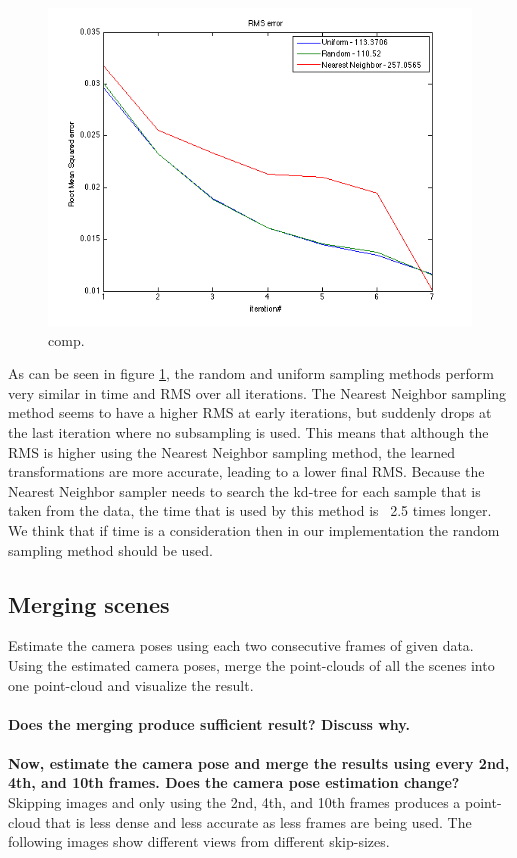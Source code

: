 \documentclass[12pt]{amsart}
\begin{document}
\begin{figure}[H]
\center
\includegraphics[scale=0.5]{images/comparison.png}
\caption{comp.}
\label{comp}
\end{figure}

As can be seen in figure \ref{comp}, the random and uniform sampling methods perform very similar in time and RMS over all iterations. The Nearest Neighbor sampling method seems to have a higher RMS at early iterations, but suddenly drops at the last iteration where no subsampling is used. This means that although the RMS is higher using the Nearest Neighbor sampling method, the learned transformations are more accurate, leading to a lower final RMS. Because the Nearest Neighbor sampler needs to search the kd-tree for each sample that is taken from the data, the time that is used by this method is ~2.5 times longer. We think that if time is a consideration then in our implementation the random sampling method should be used.


\subsection{Merging scenes}
Estimate the camera poses using each two consecutive frames of given data. Using the estimated camera poses, merge the point-clouds of all the scenes into one point-cloud and visualize the result. 
\\\\
\textbf{Does the merging produce sufficient result? Discuss why.}
\\\\
\textbf{Now, estimate the camera pose and merge the results using every 2nd, 4th, and 10th frames. Does the camera pose estimation change?}\\
Skipping images and only using the 2nd, 4th, and 10th frames produces a point-cloud that is less dense and less accurate as less frames are being used. The following images show different views from different skip-sizes.
\end{document}
